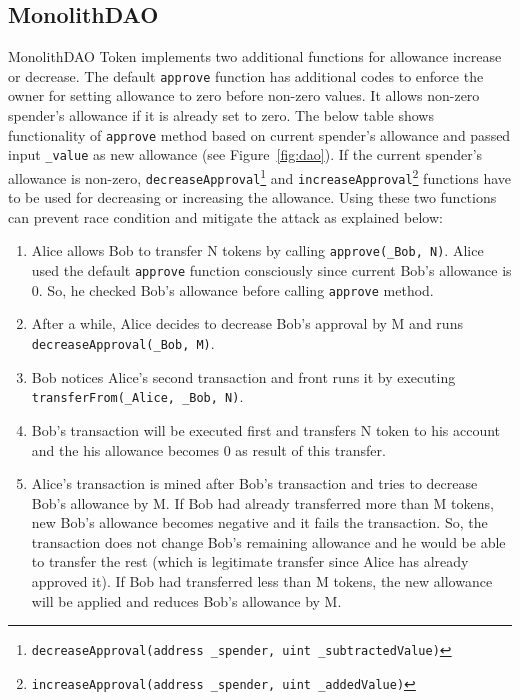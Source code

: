\subsection{MonolithDAO}
MonolithDAO Token\cite{Ref12} implements two additional functions for allowance increase or decrease. The default \texttt{approve} function has additional codes to enforce the owner for setting allowance to zero before non-zero values. It allows non-zero spender's allowance if it is already set to zero. The below table shows functionality of \texttt{approve} method based on current spender's allowance and passed input \texttt{\_value} as new allowance (see Figure~\ref{fig:dao}). \noindent If the current spender’s allowance is non-zero, \texttt{decreaseApproval}\footnote{\texttt{decreaseApproval(address \_spender, uint \_subtractedValue)}} and \texttt{increaseApproval}\footnote{\texttt{increaseApproval(address \_spender, uint \_addedValue)}} functions have to be used for decreasing or increasing the allowance. Using these two functions can prevent race condition and mitigate the attack as explained below:
\begin{enumerate}
	\item Alice allows Bob to transfer N tokens by calling \texttt{approve(\_Bob, N)}. Alice used the default \texttt{approve} function consciously since current Bob’s allowance is 0. So, he checked Bob's allowance before calling \texttt{approve} method.
	\item After a while, Alice decides to decrease Bob’s approval by M and runs \texttt{decreaseApproval(\_Bob, M)}.
	\item Bob notices Alice’s second transaction and front runs it by executing \texttt{transferFrom(\_Alice, \_Bob, N)}.
	\item Bob’s transaction will be executed first and transfers N token to his account and the his allowance becomes 0 as result of this transfer.
	\item Alice’s transaction is mined after Bob’s transaction and tries to decrease Bob’s allowance by M. If Bob had already transferred more than M tokens, new Bob’s allowance becomes negative and it fails the transaction. So, the transaction does not change Bob’s remaining allowance and he would be able to transfer the rest (which is legitimate transfer since Alice has already approved it). If Bob had transferred less than M tokens, the new allowance will be applied and reduces Bob’s allowance by M.
\end{enumerate}
